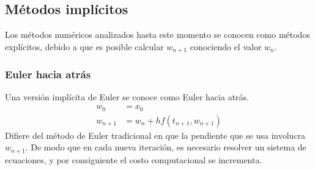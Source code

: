 \subsection{Métodos implícitos}
Los métodos numéricos analizados hasta este momento se conocen como métodos explícitos, debido a que es posible calcular $w_{n+1}$ conociendo el valor $w_n$. 
\subsubsection{Euler hacia atrás}
Una versión implícita de Euler se conoce como Euler hacia atrás. 
\begin{align}
    w_0  &= x_0 \\
    \label{backward_euler} w_{n+1} &= w_n + hf(t_{n+1}, w_{n+1})
\end{align}
Difiere del método de Euler tradicional en que la pendiente que se usa involucra $w_{n+1}$. De modo que en cada nueva iteración, es necesario resolver un sistema de ecuaciones, y por consiguiente el costo computacional se incrementa.
